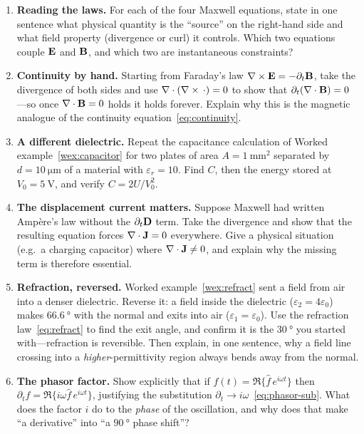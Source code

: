 \exercisessection
\begin{enumerate}[nosep]
  \item \textbf{Reading the laws.} For each of the four Maxwell equations, state
  in one sentence what physical quantity is the ``source'' on the right-hand
  side and what field property (divergence or curl) it controls. Which two
  equations couple $\mathbf{E}$ and $\mathbf{B}$, and which two are instantaneous
  constraints?

  \item \textbf{Continuity by hand.} Starting from Faraday's law
  $\nabla\times\mathbf{E}=-\partial_t\mathbf{B}$, take the divergence of both sides and use
  $\nabla\cdot(\nabla\times\,\cdot)=0$ to show that $\partial_t(\nabla\cdot\mathbf{B})=0$---so once
  $\nabla\cdot\mathbf{B}=0$ holds it holds forever. Explain why this is the magnetic analogue
  of the continuity equation~\eqref{eq:continuity}.

  \item \textbf{A different dielectric.} Repeat the capacitance calculation of
  Worked example~\ref{wex:capacitor} for two plates of area $A=\SI{1}{\milli\meter\squared}$
  separated by $d=\SI{10}{\micro\meter}$ of a material with $\varepsilon_r=10$.
  Find $C$, then the energy stored at $V_0=\SI{5}{\volt}$, and verify
  $C=2U/V_0^2$.

  \item \textbf{The displacement current matters.} Suppose Maxwell had written
  Amp\`ere's law without the $\partial_t\mathbf{D}$ term. Take the divergence and show
  that the resulting equation forces $\nabla\cdot\mathbf{J}=0$ everywhere. Give a physical
  situation (e.g.\ a charging capacitor) where $\nabla\cdot\mathbf{J}\neq0$, and explain why
  the missing term is therefore essential.

  \item \textbf{Refraction, reversed.} Worked example~\ref{wex:refract} sent a
  field from air into a denser dielectric. Reverse it: a field inside the
  dielectric ($\varepsilon_2=4\varepsilon_0$) makes $\SI{66.6}{\degree}$ with the
  normal and exits into air ($\varepsilon_1=\varepsilon_0$). Use the refraction
  law~\eqref{eq:refract} to find the exit angle, and confirm it is the
  $\SI{30}{\degree}$ you started with---refraction is reversible. Then explain,
  in one sentence, why a field line crossing into a \emph{higher}-permittivity
  region always bends away from the normal.

  \item \textbf{The phasor factor.} Show explicitly that if
  $f(t)=\Re\{\hat f\,e^{i\omega t}\}$ then $\partial_t f=\Re\{i\omega\hat
  f\,e^{i\omega t}\}$, justifying the substitution
  $\partial_t\to i\omega$~\eqref{eq:phasor-sub}. What does the factor $i$ do to
  the \emph{phase} of the oscillation, and why does that make ``a derivative''
  into ``a $\SI{90}{\degree}$ phase shift''?


\end{enumerate}
